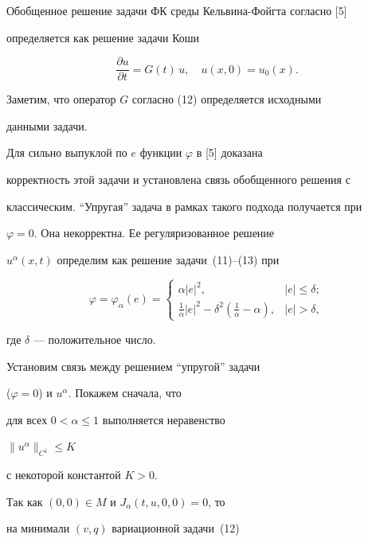 Обобщенное решение задачи ФК среды Кельвина-Фойгта согласно [5]


определяется как решение задачи Коши


\begin{equation}


\frac{\partial u}{\partial t}=G(t) \,u,\quad


u(x,0)=u_{0}(x).


\end{equation}


Заметим, что оператор $G$ согласно (12) определяется исходными


данными задачи.


Для сильно выпуклой по $e$ функции $\varphi$ в [5] доказана


корректность этой задачи и установлена связь обобщенного решения с


классическим. ``Упругая'' задача в рамках такого подхода получается при


$\varphi=0$. Она некорректна. Ее регуляризованное решение


$u^{\alpha}(x,t)$ определим как решение задачи~(11)--(13) при


$$


\varphi=\varphi_{\alpha}(e)=


\begin{cases}


\alpha |e|^{2}, & |e| \le \delta; \\ 


\frac{1}{\alpha} |e|^{2} - \delta^{2}


(\frac{1}{\alpha} - \alpha), & |e|> \delta,


\end{cases}


$$


где $\delta$ --- положительное число.


Установим связь между решением ``упругой'' задачи


($\varphi=0$) и $u^{\alpha}$. Покажем сначала, что


для всех $0 < \alpha \leq 1$ выполняется неравенство


$\|u^{\alpha}\|_{C^{1}} \le K$


с некоторой константой $K>0$.





Так как $(0,0) \in M$ и $J_{\alpha}(t,u,0,0)=0$, то


на минимали $(v,q)$ вариационной задачи~(12)


